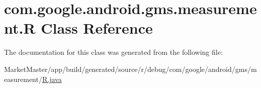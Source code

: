 \hypertarget{classcom_1_1google_1_1android_1_1gms_1_1measurement_1_1R}{}\section{com.\+google.\+android.\+gms.\+measurement.\+R Class Reference}
\label{classcom_1_1google_1_1android_1_1gms_1_1measurement_1_1R}


The documentation for this class was generated from the following file\+:\begin{DoxyCompactItemize}
\item 
Market\+Master/app/build/generated/source/r/debug/com/google/android/gms/measurement/\mbox{\hyperlink{debug_2com_2google_2android_2gms_2measurement_2R_8java}{R.\+java}}\end{DoxyCompactItemize}
